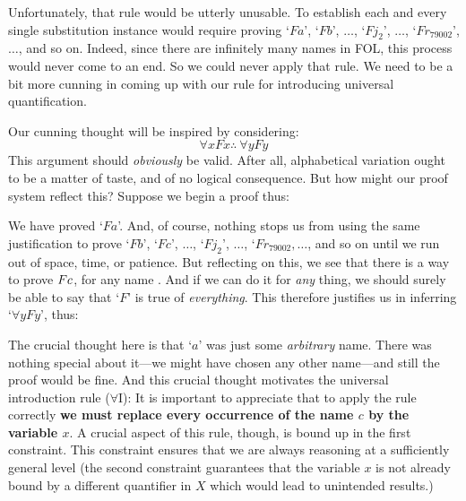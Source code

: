 Unfortunately, that rule would be utterly unusable. To establish each and every single substitution instance would require proving `$Fa$', `$Fb$', $\ldots$, `$Fj_2$', $\ldots$, `$Fr_{79002}$', $\ldots$, and so on. Indeed, since there are infinitely many names in FOL, this process would never come to an end. So we could never apply that rule. We need to be a bit more cunning in coming up with our rule for introducing universal quantification.

Our cunning thought will be inspired by considering:
$$\forall x Fx \therefore\ \forall y Fy$$
This argument should \emph{obviously} be valid. After all, alphabetical variation ought to be a matter of taste, and of no logical consequence. But how might our proof system reflect this? Suppose we begin a proof thus:
\begin{fitchproof}
	 
\end{fitchproof}
We have proved `$Fa$'. And, of course, nothing stops us from using the same justification to prove `$Fb$', `$Fc$', $\ldots$, `$Fj_2$', $\ldots$, `$Fr_{79002}, \ldots$, and so on until we run out of space, time, or patience. But reflecting on this, we see that there is a way to prove $Fc$, for any name . And if we can do it for \emph{any} thing, we should surely be able to say that `$F$' is true of \emph{everything}. This therefore justifies us in inferring `$\forall y Fy$', thus:
\begin{fitchproof}
	 
	 
\end{fitchproof}
The crucial thought here is that `$a$' was just some \emph{arbitrary} name. There was nothing special about it---we might have chosen any other name---and still the proof would be fine. And this crucial thought motivates the universal introduction rule ($\forall$I):
It is important to appreciate that to apply the rule correctly \textbf{we must replace every occurrence of the name $c$ by the variable $x$}. A crucial aspect of this rule, though, is bound up in the first constraint. This constraint ensures that we are always reasoning at a sufficiently general level (the second constraint guarantees that the variable $x$ is not already bound by a different quantifier in $X$ which would lead to unintended results.) 

